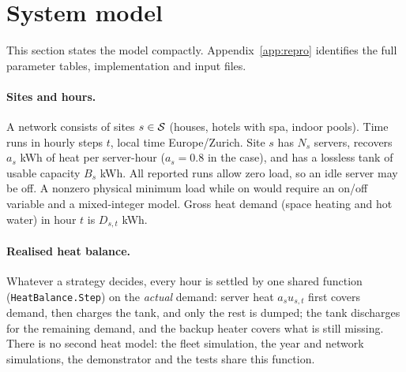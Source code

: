 \section{System model}
\label{sec:model}

This section states the model compactly. Appendix~\ref{app:repro} identifies the full parameter
tables, implementation and input files.

\paragraph{Sites and hours.} A network consists of sites $s \in \mathcal{S}$ (houses, hotels with spa,
indoor pools). Time runs in hourly steps $t$, local time Europe/Zurich. Site $s$ has $N_s$ servers,
recovers $a_s$ kWh of heat per server-hour ($a_s = 0.8$ in the case), and has a lossless tank
of usable capacity $B_s$ kWh. All reported runs allow zero load, so an idle server may be off.
A nonzero physical minimum load while on would require an on/off variable and a mixed-integer
model. Gross heat demand (space heating and hot water) in hour $t$ is $D_{s,t}$ kWh.

\paragraph{Realised heat balance.} Whatever a strategy decides, every hour is settled by one shared
function (\texttt{HeatBalance.Step}) on the \emph{actual} demand: server heat $a_s u_{s,t}$ first
covers demand, then charges the tank, and only the rest is dumped; the tank discharges for the
remaining demand, and the backup heater covers what is still missing. There is no second heat
model: the fleet simulation, the year and network simulations, the demonstrator and the tests share
this function.

